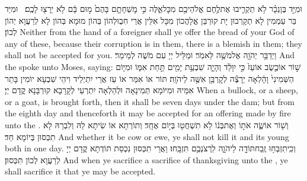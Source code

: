 {וּמִיַּ֣ד בֶּן\maqqaf נֵכָ֗ר לֹ֥א תַקְרִ֛יבוּ אֶת\maqqaf לֶ֥חֶם אֱלֹהֵיכֶ֖ם מִכׇּל\maqqaf אֵ֑לֶּה כִּ֣י מׇשְׁחָתָ֤ם בָּהֶם֙ מ֣וּם בָּ֔ם לֹ֥א יֵרָצ֖וּ לָכֶֽם׃ \setuma }
{וּמִיַּד בַּר עַמְמִין לָא תְקָרְבוּן יָת קוּרְבַּן אֱלָהֲכוֹן מִכָּל אִלֵּין אֲרֵי חִבֻוּלְהוֹן בְּהוֹן מוּמָא בְּהוֹן לָא לְרַעֲוָא יְהוֹן לְכוֹן׃}
{Neither from the hand of a foreigner shall ye offer the bread of your God of any of these, because their corruption is in them, there is a blemish in them; they shall not be accepted for you.}{}
{וַיְדַבֵּ֥ר יְהֹוָ֖ה אֶל\maqqaf מֹשֶׁ֥ה לֵּאמֹֽר׃}
{וּמַלֵּיל יְיָ עִם מֹשֶׁה לְמֵימַר׃}
{And the \lord\space spoke unto Moses, saying:}{}
{שׁ֣וֹר אוֹ\maqqaf כֶ֤שֶׂב אוֹ\maqqaf עֵז֙ כִּ֣י יִוָּלֵ֔ד וְהָיָ֛ה שִׁבְעַ֥ת יָמִ֖ים תַּ֣חַת אִמּ֑וֹ וּמִיּ֤וֹם הַשְּׁמִינִי֙ וָהָ֔לְאָה יֵרָצֶ֕ה לְקׇרְבַּ֥ן אִשֶּׁ֖ה לַיהֹוָֽה׃}
{תּוֹר אוֹ אִמַּר אוֹ עֵז אֲרֵי יִתְיְלֵיד וִיהֵי שִׁבְעָא יוֹמִין בָּתַר אִמֵּיהּ וּמִיּוֹמָא תְּמִינָאָה וּלְהַלְאָה יִתְרְעֵי לְקָרָבָא קוּרְבָּנָא קֳדָם יְיָ׃}
{When a bullock, or a sheep, or a goat, is brought forth, then it shall be seven days under the dam; but from the eighth day and thenceforth it may be accepted for an offering made by fire unto the \lord.}{}
{וְשׁ֖וֹר אוֹ\maqqaf שֶׂ֑ה אֹת֣וֹ וְאֶת\maqqaf בְּנ֔וֹ לֹ֥א תִשְׁחֲט֖וּ בְּי֥וֹם אֶחָֽד׃}
{וְתוֹרְתָא אוֹ שִׂיתָא לַהּ וְלִבְרַהּ לָא תִכְּסוּן בְּיוֹמָא חַד׃}
{And whether it be cow or ewe, ye shall not kill it and its young both in one day.}{}
{וְכִֽי\maqqaf תִזְבְּח֥וּ זֶֽבַח\maqqaf תּוֹדָ֖ה לַיהֹוָ֑ה לִֽרְצֹנְכֶ֖ם תִּזְבָּֽחוּ׃}
{וַאֲרֵי תִכְּסוּן נִכְסַת תּוֹדְתָא קֳדָם יְיָ לְרַעֲוָא לְכוֹן תִּכְּסוּן׃}
{And when ye sacrifice a sacrifice of thanksgiving unto the \lord, ye shall sacrifice it that ye may be accepted.}{}
